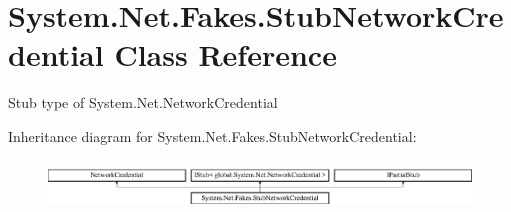\hypertarget{class_system_1_1_net_1_1_fakes_1_1_stub_network_credential}{\section{System.\-Net.\-Fakes.\-Stub\-Network\-Credential Class Reference}
\label{class_system_1_1_net_1_1_fakes_1_1_stub_network_credential}
}


Stub type of System.\-Net.\-Network\-Credential 


Inheritance diagram for System.\-Net.\-Fakes.\-Stub\-Network\-Credential\-:\begin{figure}[H]
\begin{center}
\leavevmode
\includegraphics[height=1.328588cm]{class_system_1_1_net_1_1_fakes_1_1_stub_network_credential}
\end{center}
\end{figure}
